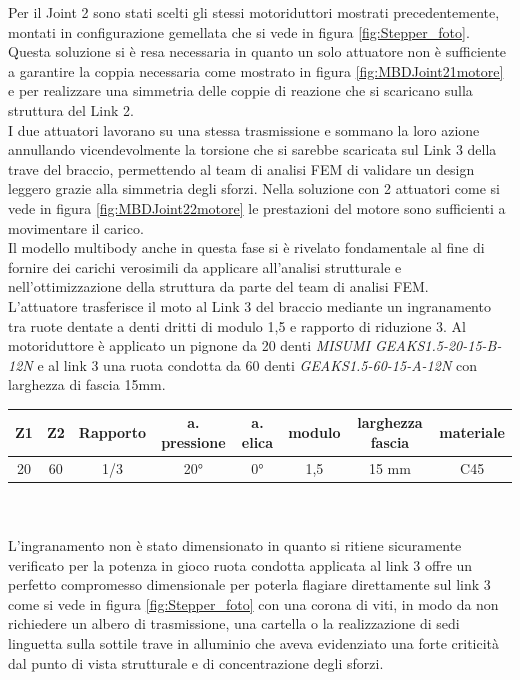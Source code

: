 \documentclass[%
corpo=11pt,
twoside,
 stile=classica,
oldstyle,
greek,%
]{toptesi}
\begin{document}
		Per il Joint 2 sono stati scelti gli stessi motoriduttori mostrati precedentemente, montati in configurazione gemellata che si vede in figura \ref{fig:Stepper_foto}. \\
		Questa soluzione si è resa necessaria in quanto un solo attuatore non è sufficiente a garantire la coppia necessaria come mostrato in figura \ref{fig:MBDJoint21motore} e per realizzare una simmetria delle coppie di reazione che si scaricano sulla struttura del Link 2. \\
		I due attuatori lavorano su una stessa trasmissione e sommano la loro azione annullando vicendevolmente la torsione che si sarebbe scaricata sul Link 3 della trave del braccio, permettendo al team di analisi FEM di validare un design leggero grazie alla simmetria degli sforzi. Nella soluzione con 2 attuatori come si vede in figura \ref{fig:MBDJoint22motore} le prestazioni del motore sono sufficienti a movimentare il carico. \\
		Il modello multibody anche in questa fase si è rivelato fondamentale al fine di fornire dei carichi verosimili da applicare all'analisi strutturale e nell'ottimizzazione della struttura da parte del team di analisi FEM. 
		\\
		L'attuatore trasferisce il moto al Link 3 del braccio mediante un ingranamento tra ruote dentate a denti dritti di modulo 1,5 e rapporto di riduzione 3. Al motoriduttore è applicato un pignone da 20 denti \textit{MISUMI GEAKS1.5-20-15-B-12N} e al link 3 una ruota condotta da 60 denti \textit{GEAKS1.5-60-15-A-12N} con larghezza di fascia 15mm. \\
		
			\begin{tabular}{|c|c|c|c|c|c|c|c|}
			
			\hline
			Z1 & Z2 & Rapporto & a. pressione & a. elica & modulo & larghezza fascia & materiale \\
			\hline
			20 & 60 & 1/3 & 20° & 0°  & 1,5 & 15 mm & C45  \\
			\hline
			
		\end{tabular}
		\\
		\\
		L'ingranamento non è stato dimensionato in quanto si ritiene sicuramente verificato per la potenza in gioco  ruota condotta applicata al link 3 offre un perfetto compromesso dimensionale per poterla flagiare direttamente sul link 3 come si vede in figura \ref{fig:Stepper_foto} con una corona di viti, in modo da non richiedere un albero di trasmissione, una cartella o la realizzazione di sedi linguetta sulla sottile trave in alluminio che aveva evidenziato una forte criticità dal punto di vista strutturale e di concentrazione degli sforzi. \\
		
\end{document}
